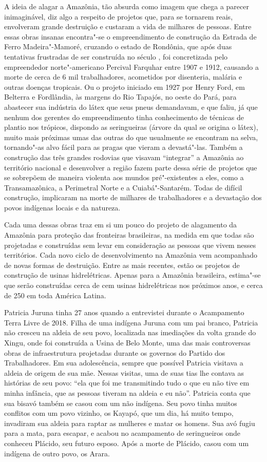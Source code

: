 A ideia de alagar a Amazônia, tão absurda como imagem que chega a parecer inimaginável, diz algo a respeito de projetos que, para se tornarem
reais, envolveram grande destruição e custaram a vida de milhares de
pessoas. Entre essas obras insanas encontra"-se o empreendimento de
construção da Estrada de Ferro Madeira"-Mamoré, cruzando o estado de
Rondônia, que após duas tentativas frustradas de ser construída no
século , foi concretizada pelo empreendedor norte"-americano Percival
Farquhar entre 1907 e 1912, causando a morte de cerca de 6 mil
trabalhadores, acometidos por disenteria, malária e outras doenças
tropicais. Ou o projeto iniciado em 1927 por Henry Ford, em Belterra
e Fordlândia, às margens do Rio Tapajós, no oeste do Pará, para
abastecer sua indústria do látex que seus pneus demandavam, e que faliu,
já que nenhum dos gerentes do empreendimento tinha conhecimento de
técnicas de plantio nos trópicos, dispondo as seringueiras (árvore da
qual se origina o látex), muito mais próximas umas das outras do que
usualmente se encontram na selva, tornando"-as alvo fácil para as pragas
que vieram a devastá"-las. Também a construção das três grandes rodovias
que visavam ``integrar'' a Amazônia ao território nacional e desenvolver a
região fazem parte dessa série de projetos que se sobrepõem de maneira
violenta aos mundos pré"-existentes a eles, como a Transamazônica, a
Perimetral Norte e a Cuiabá"-Santarém. Todas de difícil construção,
implicaram na morte de milhares de trabalhadores e a devastação dos
povos indígenas locais e da natureza.

Cada uma dessas obras traz em si um pouco do projeto de alagamento da
Amazônia para proteção das fronteiras brasileiras, na medida em que
todas são projetadas e construídas sem levar em consideração as pessoas
que vivem nesses territórios. Cada novo ciclo de desenvolvimento na
Amazônia vem acompanhado de novas formas de destruição. Entre as mais
recentes, estão os projetos de construção de usinas hidrelétricas.
Apenas para a Amazônia brasileira, estima"-se que serão
construídas cerca de cem usinas hidrelétricas nos próximos anos, e cerca
de 250 em toda América Latina.

Patricia Juruna tinha 27 anos quando a entrevistei durante o Acampamento
Terra Livre de 2018. Filha de uma indígena Juruna com um pai branco,
Patricia não cresceu na aldeia de seu povo, localizada nas imediações da
volta grande do Xingu, onde foi construída a Usina de Belo Monte, uma
das mais controversas obras de infraestrutura projetadas durante os
governos do Partido dos Trabalhadores. Em sua adolescência, sempre que
possível Patricia visitava a aldeia de origem de sua mãe. Nessas
visitas, uma de suas tias lhe contava as histórias de seu povo: ``ela
que foi me transmitindo tudo o que eu não tive em minha infância, que as
pessoas tiveram na aldeia e eu não''. Patricia conta que sua bisavó
também se casou com um não indígena. Seu povo tinha muitos conflitos com
um povo vizinho, os Kayapó, que um dia, há muito tempo, invadiram sua
aldeia para raptar as mulheres e matar os homens. Sua avó fugiu para a
mata, para escapar, e acabou no acampamento de seringueiros onde
conheceu Plácido, seu futuro esposo. Após a morte de Plácido, casou com
um indígena de outro povo, os Arara.

